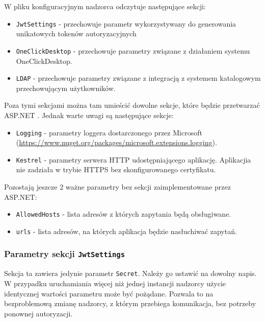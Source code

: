 \documentclass[../opis-rozwiazania.tex]{subfiles}
\begin{document}
W pliku konfiguracyjnym nadzorca odczytuje następujące sekcji:
\begin{itemize}
  \item \texttt{JwtSettings} - przechowuje parametr wykorzystywany do generowania unikatowych tokenów autoryzacyjnych
  \item \texttt{OneClickDesktop} - przechowuje parametry związane z działaniem systemu OneClickDesktop.
  \item \texttt{LDAP} - przechowuje parametry związane z integracją z systemem katalogowym przechowującym użytkowników.
\end{itemize}
Poza tymi sekcjami można tam umieścić dowolne sekcje, które będzie przetwarzać ASP.NET \parencite{asp-conf}.
Jednak warte uwagi są następujące sekcje:
\begin{itemize}
  \item \texttt{Logging} - parametry loggera dostarczonego przez Microsoft (\url{https://www.nuget.org/packages/microsoft.extensions.logging}).
  \item \texttt{Kestrel} - parametry serwera HTTP udostępniającego aplikację. Aplikacjia nie zadziała w trybie HTTPS bez skonfigurowanego certyfikatu.
\end{itemize}
\noindent
Pozostają jeszcze 2 ważne parametry bez sekcji zaimplementowane przez ASP.NET:
\begin{itemize}
  \item \texttt{AllowedHosts} - lista adresów z których zapytania będą obsługiwane.
  \item \texttt{urls} - lista adresów, na których aplikacja będzie nasłuchiwać zapytań.
\end{itemize}

\subsubsection{Parametry sekcji \texttt{JwtSettings}}
Sekcja ta zawiera jedynie parametr \texttt{Secret}. Należy go ustawić na dowolny napis. W przypadku uruchamiania więcej niż jednej instancji nadzorcy użycie identycznej wartości parametru może być pożądane. Pozwala to na bezproblemową zmianę nadzorcy, z którym przebiega komunikacja, bez potrzeby ponownej autoryzacji.
\end{document}
